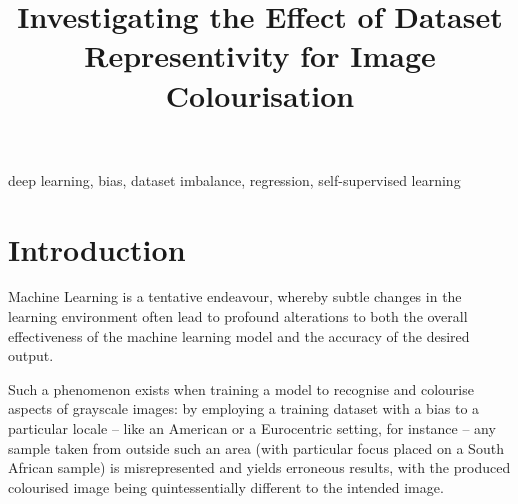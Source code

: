 \documentclass[conference]{IEEEtran}
\begin{document}
\title{Investigating the Effect of Dataset Representivity for Image Colourisation}

\author{
\and
{} 
\and
{}
}

\maketitle

\begin{abstract}

\end{abstract}

\begin{IEEEkeywords}
deep learning, bias, dataset imbalance, regression, self-supervised learning
\end{IEEEkeywords}

\section{Introduction}

Machine Learning is a tentative endeavour, whereby subtle changes in the learning environment often lead to profound alterations to both the overall effectiveness of the machine learning model and the accuracy of the desired output. 

Such a phenomenon exists when training a model to recognise and colourise aspects of grayscale images: by employing a training dataset with a bias to a particular locale – like an American or a Eurocentric setting, for instance – any sample taken from outside such an area (with particular focus placed on a South African sample) is misrepresented and yields erroneous results, with the produced colourised image being quintessentially different to the intended image.
\end{document}
